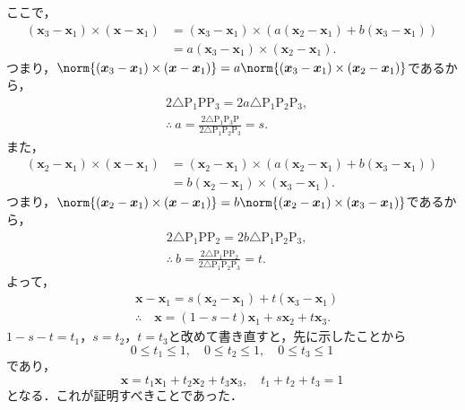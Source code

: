 \begin{tproof}
  ここで，
  \begin{align*}
    (\bm{x}_3 - \bm{x}_1) \times (\bm{x}-\bm{x}_1) & =  (\bm{x}_3 - \bm{x}_1) \times (a(\bm{x}_2 - \bm{x}_1) + b(\bm{x}_3 - \bm{x}_1)) \\
                                                   & = a (\bm{x}_3- \bm{x}_1) \times (\bm{x}_2 - \bm{x}_1).
  \end{align*}
  つまり，$\norm{(\bm{x}_3 - \bm{x}_1) \times (\bm{x}-\bm{x}_1)} = a \norm{(\bm{x}_3- \bm{x}_1) \times (\bm{x}_2 - \bm{x}_1)}$であるから，
  \begin{align*}
     & 2 \triangle{\mathrm{P}_1 \mathrm{P} \mathrm{P}_3} = 2 a \triangle{\mathrm{P}_1 \mathrm{P}_2 \mathrm{P}_3},                         \\
     & \therefore ~a = \frac{2 \triangle{\mathrm{P}_1 \mathrm{P}_3 \mathrm{P}}} {2 \triangle{\mathrm{P}_1 \mathrm{P}_2 \mathrm{P}_3}}= s.
  \end{align*}
  また，
  \begin{align*}
    (\bm{x}_2 - \bm{x}_1) \times (\bm{x}-\bm{x}_1) & =  (\bm{x}_2 - \bm{x}_1) \times (a(\bm{x}_2 - \bm{x}_1) + b(\bm{x}_3 - \bm{x}_1)) \\
                                                   & = b (\bm{x}_2- \bm{x}_1) \times (\bm{x}_3 - \bm{x}_1).
  \end{align*}
  つまり，$\norm{(\bm{x}_2 - \bm{x}_1) \times (\bm{x}-\bm{x}_1)} = b \norm{(\bm{x}_2- \bm{x}_1) \times (\bm{x}_3 - \bm{x}_1)}$であるから，
  \begin{align*}
     & 2 \triangle{\mathrm{P}_1 \mathrm{P} \mathrm{P}_2} = 2 b \triangle{\mathrm{P}_1 \mathrm{P}_2 \mathrm{P}_3},                         \\
     & \therefore ~b = \frac{2 \triangle{\mathrm{P}_1 \mathrm{P} \mathrm{P}_2} }{2 \triangle{\mathrm{P}_1 \mathrm{P}_2 \mathrm{P}_3}}= t.
  \end{align*}
  よって，
  \begin{align*}
     & \bm{x} - \bm{x}_1 = s(\bm{x}_2 - \bm{x}_1) + t(\bm{x}_3 - \bm{x}_1) \\
     & \therefore \quad \bm{x} = (1-s-t)\bm{x}_1 + s\bm{x}_2 + t\bm{x}_3.
  \end{align*}
  $1-s-t=t_1 $，$s=t_2$，$t=t_3$と改めて書き直すと，先に示したことから
  \[
    0 \le t_1 \le 1 ,\quad 0 \le t_2 \le 1 ,\quad 0 \le t_3 \le 1
  \]
  であり，
  \[
    \bm{x} = t_1\bm{x}_1 + t_2\bm{x}_2 + t_3 \bm{x}_3,\quad t_1+t_2+t_3=1
  \]
  となる．これが証明すべきことであった．
\end{tproof}
%


